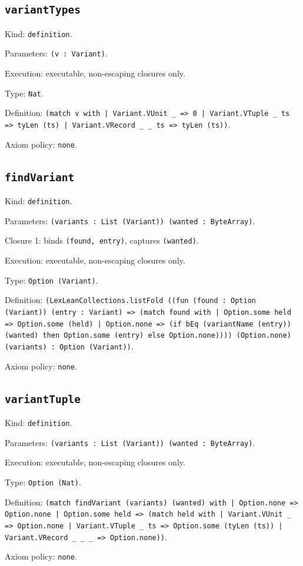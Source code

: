 \documentclass[11pt]{article}
\begin{document}
\subsection*{\texttt{variantTypes}}
\noindent Kind: \texttt{definition}.\par
\noindent Parameters: \texttt{(v : Variant)}.\par
\noindent Execution: executable, non-escaping closures only.\par
\noindent Type: \texttt{Nat}.\par
\noindent Definition: \texttt{(match v with | Variant.VUnit \_ => 0 | Variant.VTuple \_ ts => tyLen (ts) | Variant.VRecord \_ \_ ts => tyLen (ts))}.\par
\noindent Axiom policy: \texttt{none}.\par
\subsection*{\texttt{findVariant}}
\noindent Kind: \texttt{definition}.\par
\noindent Parameters: \texttt{(variants : List (Variant)) (wanted : ByteArray)}.\par
\noindent Closure 1: binds \texttt{(found, entry)}, captures \texttt{(wanted)}.\par
\noindent Execution: executable, non-escaping closures only.\par
\noindent Type: \texttt{Option (Variant)}.\par
\noindent Definition: \texttt{(LexLeanCollections.listFold ((fun (found : Option (Variant)) (entry : Variant) => (match found with | Option.some held => Option.some (held) | Option.none => (if bEq (variantName (entry)) (wanted) then Option.some (entry) else Option.none)))) (Option.none) (variants) : Option (Variant))}.\par
\noindent Axiom policy: \texttt{none}.\par
\subsection*{\texttt{variantTuple}}
\noindent Kind: \texttt{definition}.\par
\noindent Parameters: \texttt{(variants : List (Variant)) (wanted : ByteArray)}.\par
\noindent Execution: executable, non-escaping closures only.\par
\noindent Type: \texttt{Option (Nat)}.\par
\noindent Definition: \texttt{(match findVariant (variants) (wanted) with | Option.none => Option.none | Option.some held => (match held with | Variant.VUnit \_ => Option.none | Variant.VTuple \_ ts => Option.some (tyLen (ts)) | Variant.VRecord \_ \_ \_ => Option.none))}.\par
\noindent Axiom policy: \texttt{none}.\par
\end{document}
